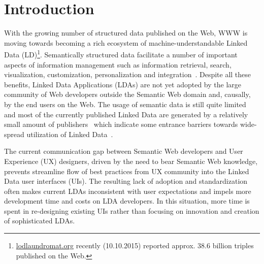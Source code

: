 \documentclass{acm_proc_article-sp}
\begin{document}




\section{Introduction}


With the growing number of structured data published on the Web, WWW is moving towards becoming a rich ecosystem of machine-understandable Linked Data (LD)\footnote{\url{lodlaundromat.org} recently (10.10.2015) reported approx. 38.6 billion triples published on the Web.}.
Semantically structured data facilitate a number of important aspects of
information management such as information retrieval, search, visualization,  customization, personalization and integration~\cite{SCAJ-Khalili-2013}.
Despite all these benefits, Linked Data Applications (LDAs) are not yet adopted by the large community of Web developers outside the Semantic Web domain and, causally, by the end users on the Web.
The usage of semantic data is still quite limited and most of the currently published Linked Data are generated by a relatively small amount of publishers~\cite{ontowiki-swj} which indicate some entrance barriers towards wide-spread utilization of Linked Data~\cite{StegemannZ14}.

The current communication gap between Semantic Web developers and User Experience (UX) designers, driven by the need to bear Semantic Web knowledge, prevents streamline flow of best practices from UX community into the Linked Data user interfaces (UIs).
The resulting lack of adoption and standardization often makes current LDAs inconsistent with user expectations and impels more development time and costs on LDA developers.
In this situation, more time is spent in re-designing existing UIs rather than focusing on innovation and creation of sophisticated LDAs.
 
\end{document}
